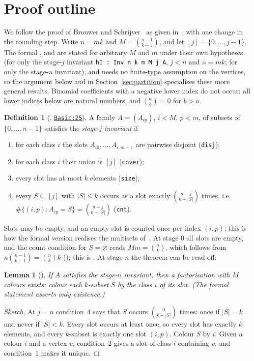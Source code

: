 \documentclass[11pt]{article}
\newtheorem{lemma}[theorem]{Lemma}
\theoremstyle{definition}
\newtheorem{definition}[theorem]{Definition}
\theoremstyle{remark}
\newcommand{\lean}[1]{\texttt{#1}}
\newcommand{\repo}{https://github.com/jpbald93/baranyai}
\newcommand{\commit}{051ae8c4063be0bb70f1726e9f60d0319dd37d91}
\newcommand{\src}[2]{\href{\repo/blob/\commit/Baranyai/#1.lean\#L#2}{\texttt{#1:#2}}}
\begin{document}
\section{Proof outline}\label{sec:proof}

We follow the proof of Brouwer and Schrijver~\cite{BrouwerSchrijver} as given in~\cite[Ch.~38]{vLW},
with one change in the rounding step. Write $n=mk$ and $M=\binom{n-1}{k-1}$, and let
$[j]=\{0,\dots,j-1\}$. The formal ,  and
 are stated for arbitrary $M$ and $m$ under their own
hypotheses (for  only the stage-$j$ invariant \lean{hI : Inv n k m M j A}, $j<n$
and $n=mk$; for
 only the stage-$n$ invariant), and
 needs no finite-type assumption on the vertices, so the argument
below and in Section~\ref{sec:partition} specialises these more general results. Binomial coefficients with a negative lower index do not occur: all lower
indices below are natural numbers, and $\binom ab=0$ for $b>a$.

\begin{definition}[, \src{Basic}{25}]\label{def:inv}
A family $A=(A_{ip})$, $i<M$, $p<m$, of subsets of $\{0,\dots,n-1\}$ satisfies the
\emph{stage-$j$ invariant} if
\begin{enumerate}
\item for each class $i$ the slots $A_{i0},\dots,A_{i,m-1}$ are pairwise disjoint (\lean{disj});
\item for each class $i$ their union is $[j]$ (\lean{cover});
\item every slot has at most $k$ elements (\lean{size});
\item every $S\subseteq[j]$ with $|S|\le k$ occurs as a slot exactly $\binom{n-j}{k-|S|}$ times,
i.e.\ $\#\{(i,p):A_{ip}=S\}=\binom{n-j}{k-|S|}$ (\lean{cnt}).
\end{enumerate}
\end{definition}
Slots may be empty, and an empty slot is counted once per index $(i,p)$; this is how the formal
version realises the multisets of~\cite{vLW}. At stage $0$ all slots are empty, and the
count condition for $S=\varnothing$ reads $Mm=\binom nk$, which follows from
$n\binom{n-1}{k-1}=\binom nk k$ (); this is . At stage
$n$ the theorem can be read off:

\begin{lemma}[]\label{lem:final}
If $A$ satisfies the stage-$n$ invariant, then a factorisation with $M$ colours exists: colour each
$k$-subset $S$ by the class $i$ of its slot. (The formal statement asserts only existence.)
\end{lemma}
\begin{proof}[Sketch]
At $j=n$ condition~4 says that $S$ occurs $\binom{0}{k-|S|}$ times: once if $|S|=k$ and never if
$|S|<k$. Every slot occurs at least once, so every slot has exactly $k$ elements, and every
$k$-subset is exactly one slot $(i,p)$. Colour $S$ by $i$. Given a colour $i$ and a vertex $v$,
condition~2 gives a slot of class $i$ containing $v$, and condition~1 makes it unique.
\end{proof}
\end{document}
